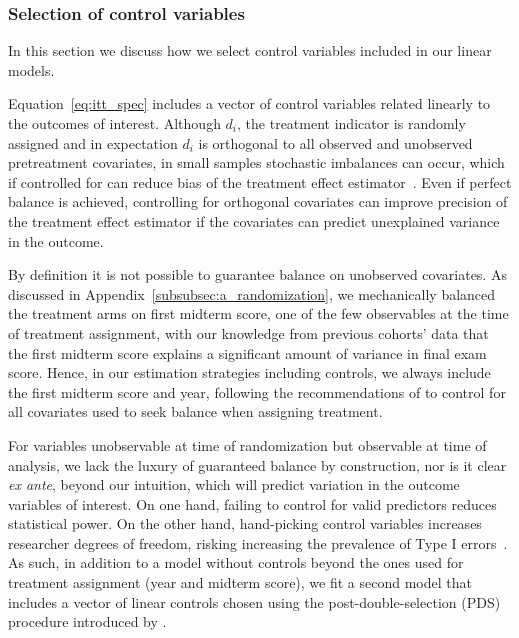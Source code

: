 \documentclass[12pt]{article}
\begin{document}
\subsubsection{Selection of control variables} \label{subsubsec:a_selection}

In this section we discuss how we select control variables included in our linear models.

Equation~\ref{eq:itt_spec} includes a vector of control variables related linearly to the outcomes of interest.
Although $d_i$, the treatment indicator is randomly assigned and in expectation $d_i$ is orthogonal to all observed and unobserved pretreatment covariates, in small samples stochastic imbalances can occur, which if controlled for can reduce bias of the treatment effect estimator~\parencite{ai2017}.
Even if perfect balance is achieved, controlling for orthogonal covariates can improve precision of the treatment effect estimator if the covariates can predict unexplained variance in the outcome.

By definition it is not possible to guarantee balance on unobserved covariates.
As discussed in Appendix~\ref{subsubsec:a_randomization}, we mechanically balanced the treatment arms on first midterm score, one of the few observables at the time of treatment assignment, with our knowledge from previous cohorts' data that the first midterm score explains a significant amount of variance in final exam score.
Hence, in our estimation strategies including controls, we always include the first midterm score and year, following the recommendations of \textcite{bm2009} to control for all covariates used to seek balance when assigning treatment.

For variables unobservable at time of randomization but observable at time of analysis, we lack the luxury of guaranteed balance by construction, nor is it clear \textit{ex ante}, beyond our intuition, which will predict variation in the outcome variables of interest.
On one hand, failing to control for valid predictors reduces statistical power.
On the other hand, hand-picking control variables increases researcher degrees of freedom, risking increasing the prevalence of Type I errors~\parencite{sns2011}.
As such, in addition to a model without controls beyond the ones used for treatment assignment (year and midterm score), we fit a second model that includes a vector of linear controls chosen using the post-double-selection (PDS) procedure introduced by \textcite{bch2014a}.
\end{document}

